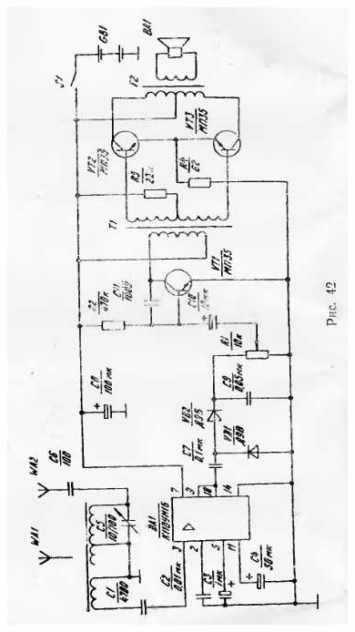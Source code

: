 \documentclass[12pt]{article}
\begin{document}
\newpage

\hspace*{0.7cm}\includegraphics[scale=0.99, angle=-1]{ekon3_042_1}

\newpage

\hrulefill
\end{document}

